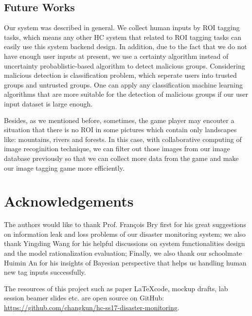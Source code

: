 \subsection{Future Works}

Our system was described in general. We collect human inputs by ROI tagging tasks, 
which means any other HC system that related to ROI tagging tasks can easily use this system backend design.
In addition, due to the fact that we do not have enough user inputs at present, we use a certainty algorithm instead of 
uncertainty probablistic-based algorithm to detect malicious groups. 
Considering malicious detection is classification problem, which seperate users into trusted groups and untrusted groups. 
One can apply any classification machine learning algorithms that are more suitable for the detection of malicious groups 
if our user input dataset is large enough.

Besides, as we mentioned before, sometimes, the game player may encouter a situation that 
there is no ROI in some pictures which contain only landscapes like: mountains, rivers and forests.
In this case, with collaborative computing of image recoginition technique, we can filter out those images 
from our image database previously so that we can collect more data from the game and 
make our image tagging game more efficiently.

\section*{Acknowledgements}
The authors would like to thank Prof. Fran\c{c}ois Bry first for
his great suggestions on information leak and loss problems of our disaster monitoring system;
we also thank Yingding Wang for his helpful discussions on system functionalities design 
and the model rationalization evaluation;
Finally, we also thank our schoolmate Huimin An for his insights of Bayesian perspective that
helps us handling human new tag inputs successfully.

The resources of this project such as paper \LaTeX code, mockup drafts, 
lab session beamer slides etc. are open source on GitHub: \\
\url{https://github.com/changkun/hc-ss17-disaster-monitoring}.
